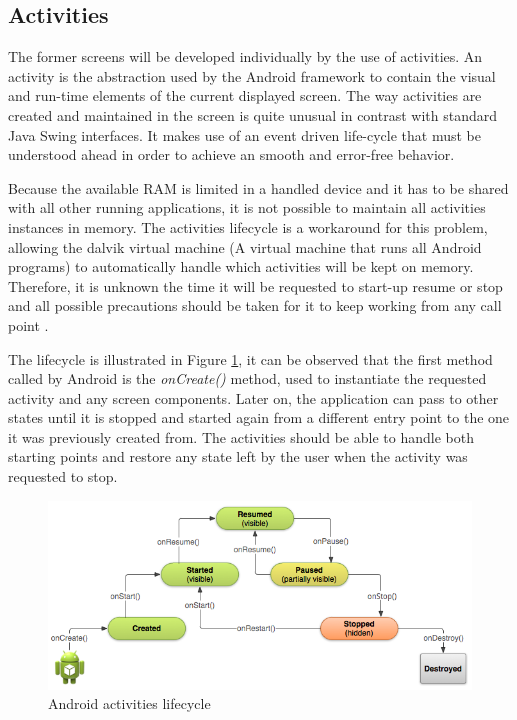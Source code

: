 \subsection{Activities}
The former screens will be developed individually by the use of activities. An activity is the abstraction used by the Android framework to contain the visual and run-time elements of the current displayed screen. The way activities are created and maintained in the screen is quite unusual in contrast with standard Java Swing interfaces. It makes use of an event driven life-cycle that must be understood ahead in order to achieve an smooth and error-free behavior. 

Because the available RAM is limited in a handled device and it has to be shared with all other running applications, it is not possible to maintain  all activities instances in memory. The activities lifecycle is a workaround for this problem, allowing the dalvik virtual machine (A virtual machine that runs all Android programs) to automatically handle which activities will be kept on memory. Therefore, it is unknown the time it will be requested to start-up resume or stop and all possible precautions should be taken for it to keep working from any call point .

The lifecycle is illustrated in Figure \ref{fig:activities_lifecycle}, it can be observed that the first method called by Android is the \textit{onCreate()} method, used to instantiate the requested activity and any screen components. Later on, the application can pass to other states until it is stopped and started again from a different entry point to the one it was previously created from. The activities should be able to handle both starting points and restore any state left by the user when the activity was requested to stop. 

\begin{figure}[H]
\begin{adjustbox}{width=1\textwidth,center=\textwidth}
  \centering
  \includegraphics[scale=1]{images/basic-lifecycle.png}
\end{adjustbox}
  \caption[Android activities lifecycle]{Android activities lifecycle\footnotemark}
  \label{fig:activities_lifecycle}
\end{figure}

